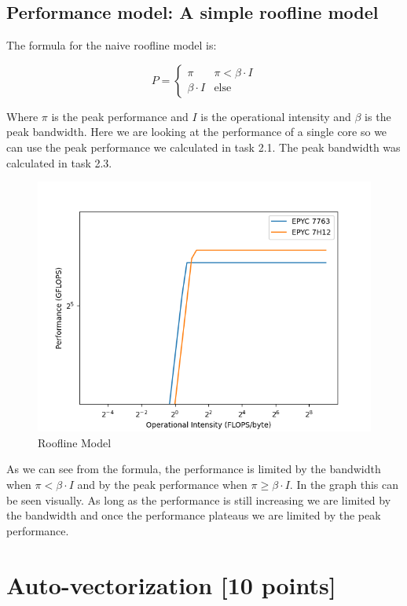\documentclass[unicode,11pt,a4paper,oneside,numbers=endperiod,openany]{scrartcl}
\begin{document}
\subsection{Performance model: A simple roofline model}

The formula for the naive roofline model is:

$$
P = \begin{cases}
    \pi & \pi < \beta \cdot I \\
    \beta \cdot I & \text{else}
\end{cases}
$$

Where $\pi$ is the peak performance and $I$ is the operational intensity and $\beta$ is the peak bandwidth.
Here we are looking at the performance of a single core so we can use the peak performance we calculated in task 2.1.
The peak bandwidth was calculated in task 2.3. 

\begin{figure}[ht]
\centering
\includegraphics[width=\textwidth]{roofline_plot.png}
\caption{Roofline Model}
\label{fig:roofline}
\end{figure}

As we can see from the formula, the performance is limited by the bandwidth when $\pi < \beta \cdot I$ and by the peak performance when $\pi \geq \beta \cdot I$.
In the graph this can be seen visually. As long as the performance is still increasing we are limited by the bandwidth and once the performance plateaus we are limited by the peak performance.



\section{Auto-vectorization [10 points]}
\end{document}
